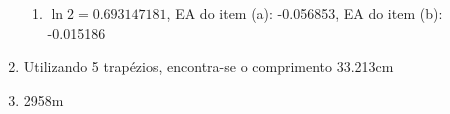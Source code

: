 \documentclass[a4paper]{article}
\begin{document}
\begin{enumerate}
\begin{enumerate}
  \item $\ln 2 = 0.693147181$, EA do item (a): -0.056853, EA do item
    (b): -0.015186
  \end{enumerate}

\item Utilizando 5 trapézios, encontra-se o comprimento 33.213cm

\item 2958m

\end{enumerate}
\end{document}
